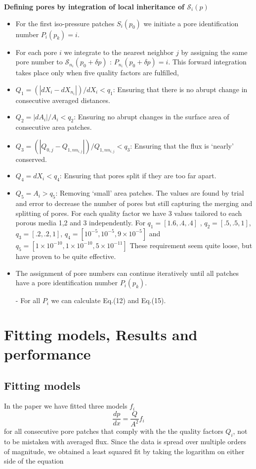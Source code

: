 \documentclass[draft,jgrga]{agutexSI2019}
\begin{document}
\begin{article}
\noindent\textbf{Defining pores by integration of local inheritance of $\mathcal{S}_i(p)$}
\begin{itemize}
	\item For the first iso-pressure patches $S_i(p_0)$ we initiate a pore identification number $P_i(p_k) = i$. 
	\item For each pore $i$ we integrate to the nearest neighbor $j$ by assigning the same pore number to $\mathcal{S}_{n_i}(p_0+\delta p)$ : $P_{n_i}(p_0+\delta p) = i$. This forward integration takes place only when five quality factors are fulfilled,
	\item $Q_1 = (|dX_i-dX_{n_i}|)/dX_i<q_1$: Ensuring that there is no abrupt change in consecutive averaged distances. 
	\item $Q_2 = |dA_i|/A_i<q_2$: Ensuring no abrupt changes in the surface area of consecutive area patches. 
	\item $Q_3 = (|Q_{0,j}-Q_{1,nn_{i,j}}|)/Q_{1,nn_{i,j}}<q_3$: Ensuring that the flux is `nearly' conserved.  
	\item $Q_4 = dX_i < q_4$: Ensuring that pores split if they are too far apart. 
	\item $Q_5 = A_i > q_5$: Removing `small' area patches. 
	The values are found by trial and error to decrease the number of pores but still capturing the merging and splitting of pores. For each quality factor we have 3 values tailored to each porous media 1,2 and 3 independently. For $q_1 = [1.6,.4,.4]$
, $q_2 = [.5,.5,1]$, $q_3 = [.2,.2,1]$, $q_4 = [10^{-5},10^{-5},9\times10^{-5}]$ and $q_5 = [1\times10^{-10},1\times10^{-10},5\times10^{-11}]$	These requirement seem quite loose, but have proven to be quite effective. 
	\item The assignment of pore numbers can continue iteratively until all patches have a pore identification number $P_i(p_k)$.	
	\item[-]For all $P_i$ we can calculate Eq.(12) and Eq.(15).
\end{itemize}



\section{Fitting models, Results and performance}
\subsection{Fitting models}
In the paper we have fitted three models $f_i$ 
\begin{equation}
	\frac{dp}{dx} = \frac{Q}{A^2} f_i
\end{equation}
for all consecutive pore patches that comply with the the quality factors $Q_i$, not to be mistaken with averaged flux. Since the data is spread over multiple orders of magnitude, we obtained a least squared fit by taking the logarithm on either side of the equation


\end{article}
\end{document}
